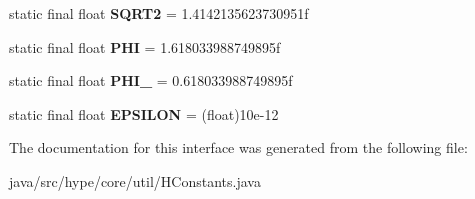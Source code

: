 \begin{DoxyCompactItemize}
\item 
\hypertarget{interfacehype_1_1core_1_1util_1_1_h_constants_a39c184dac11cef9f4b1ddc54f052e612}{static final float {\bfseries S\-Q\-R\-T2} = 1.\-4142135623730951f}\label{interfacehype_1_1core_1_1util_1_1_h_constants_a39c184dac11cef9f4b1ddc54f052e612}

\item 
\hypertarget{interfacehype_1_1core_1_1util_1_1_h_constants_ae05e0f9228654eda8d3fcb6e5b010fd9}{static final float {\bfseries P\-H\-I} = 1.\-618033988749895f}\label{interfacehype_1_1core_1_1util_1_1_h_constants_ae05e0f9228654eda8d3fcb6e5b010fd9}

\item 
\hypertarget{interfacehype_1_1core_1_1util_1_1_h_constants_a38004c29ec77f13033b3a5993a7d4818}{static final float {\bfseries P\-H\-I\-\_} = 0.\-618033988749895f}\label{interfacehype_1_1core_1_1util_1_1_h_constants_a38004c29ec77f13033b3a5993a7d4818}

\item 
\hypertarget{interfacehype_1_1core_1_1util_1_1_h_constants_af58dd23b7edb42a36cd6cae38a7174bf}{static final float {\bfseries E\-P\-S\-I\-L\-O\-N} = (float)10e-\/12}\label{interfacehype_1_1core_1_1util_1_1_h_constants_af58dd23b7edb42a36cd6cae38a7174bf}

\end{DoxyCompactItemize}


The documentation for this interface was generated from the following file\-:\begin{DoxyCompactItemize}
\item 
java/src/hype/core/util/H\-Constants.\-java\end{DoxyCompactItemize}
